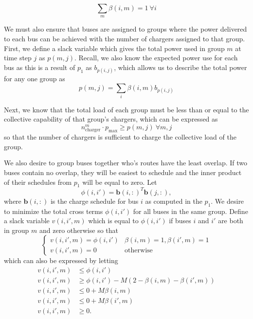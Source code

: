 \begin{equation}\label{eqn:groups:groupId}
	\sum_m\beta(i,m) = 1 \ \forall i
\end{equation}
\par We must also ensure that buses are assigned to groups where the power delivered to each bus can be achieved with the number of chargers assigned to that group. First, we define a slack variable which gives the total power used in group $m$ at time step $j$ as $p(m,j)$. Recall, we also know the expected power use for each bus as this is a result of $p_1$ as $b_{p(i,j)}$, which allows us to describe the total power for any one group as
\begin{equation}\label{eqn:groups:groupPower}
 p(m,j) = \sum_i\beta(i,m)b_{p(i,j)}
\end{equation}
\par Next, we know that the total load of each group must be less than or equal to the collective capability of that group's chargers, which can be expressed as
\begin{equation}\label{eqn:groups:chargeLimit}
	n^m_{\text{charger}}\cdot p_{\text{max}} \ge p(m,j) \ \forall m,j
\end{equation}
so that the number of chargers is sufficient to charge the collective load of the group. 
\par We also desire to group buses together who's routes have the least overlap. If two buses contain no overlap, they will be easiest to schedule and the inner product of their schedules from $p_1$ will be equal to zero. Let 
\begin{equation*}
\phi(i,i') = \mathbf{b}(i,:)^T\mathbf{b}(j,:),
\end{equation*}
where $\mathbf{b}(i,:)$ is the charge schedule for bus $i$ as computed in the $p_1$. We desire to minimize the total cross terms $\phi(i,i')$ for all buses in the same group.  Define a slack variable $v(i,i',m)$ which is equal to $\phi(i,i')$ if buses $i$ and $i'$ are both in group $m$ and zero otherwise so that
\begin{equation*}
	\begin{cases}
		v(i,i',m) = \phi(i,i') & \beta(i,m) = 1, \beta(i',m) = 1 \\
		v(i,i',m) = 0 & \text{otherwise}
	\end{cases}
\end{equation*}
which can also be expressed by letting
\begin{equation}\label{eqn:groups:innerProd}\begin{aligned}
	v(i,i',m) &\le \phi(i,i') \\
	v(i,i',m) &\ge \phi(i,i') - M\left (2 - \beta(i,m) - \beta(i',m)\right ) \\
	v(i,i',m) &\le 0 + M\beta(i,m) \\
	v(i,i',m) &\le 0 + M\beta(i',m) \\
	v(i,i',m) &\ge 0.
\end{aligned}\end{equation}
